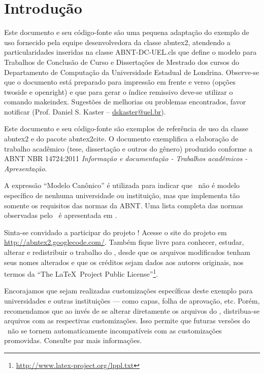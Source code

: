 \documentclass[
	12pt,				%
	openright,			%
	oneside,			%
	a4paper,			%
	tcc,			%
	]{ABNT-DC-UEL}
\begin{document}
\chapter{Introdução}

Este documento e seu código-fonte são uma pequena adaptação do exemplo de uso
fornecido pela equipe desenvolvedora da classe \textsf{abntex2}, atendendo a
particularidades inseridas na classe \textsf{ABNT-DC-UEL.cls} que define
o modelo para Trabalhos de Conclusão de Curso e Dissertações de Mestrado dos
cursos do Departamento de Computação da Universidade Estadual de Londrina.
Observe-se que o documento está preparado para impressão em frente e verso
(opções twoside e openright) e que para gerar o índice remissivo deve-se 
utilizar o comando \textsf{makeindex}.
Sugestões de melhorias ou problemas encontrados, favor notificar (Prof.
Daniel S. Kaster -- \href{mailto:dskaster@uel.br}{dskaster@uel.br}).

Este documento e seu código-fonte são exemplos de referência de uso da classe
\textsf{abntex2} e do pacote \textsf{abntex2cite}. O documento 
exemplifica a elaboração de trabalho acadêmico (tese, dissertação e outros do
gênero) produzido conforme a ABNT NBR 14724:2011 \emph{Informação e documentação
- Trabalhos acadêmicos - Apresentação}.

A expressão ``Modelo Canônico'' é utilizada para indicar que \abnTeX\ não é
modelo específico de nenhuma universidade ou instituição, mas que implementa tão
somente os requisitos das normas da ABNT. Uma lista completa das normas
observadas pelo \abnTeX\ é apresentada em .

Sinta-se convidado a participar do projeto \abnTeX! Acesse o site do projeto em
\url{http://abntex2.googlecode.com/}. Também fique livre para conhecer,
estudar, alterar e redistribuir o trabalho do \abnTeX, desde que os arquivos
modificados tenham seus nomes alterados e que os créditos sejam dados aos
autores originais, nos termos da ``The \LaTeX\ Project Public
License''\footnote{\url{http://www.latex-project.org/lppl.txt}}.

Encorajamos que sejam realizadas customizações específicas deste exemplo para
universidades e outras instituições --- como capas, folha de aprovação, etc.
Porém, recomendamos que ao invés de se alterar diretamente os arquivos do
\abnTeX, distribua-se arquivos com as respectivas customizações.
Isso permite que futuras versões do \abnTeX~não se tornem automaticamente
incompatíveis com as customizações promovidas. Consulte
 par mais informações.
\end{document}
